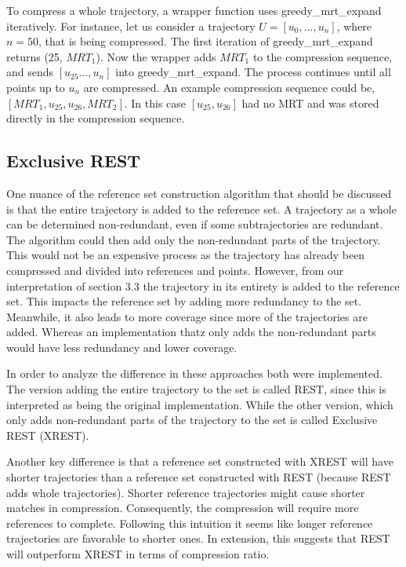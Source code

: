 To compress a whole trajectory, a wrapper function uses greedy\_mrt\_expand iteratively. For instance, let us consider a trajectory $U = [u_0, ..., u_n]$, where $n = 50$, that is being compressed. The first iteration of greedy\_mrt\_expand returns (25, $MRT_1$). Now the wrapper adds $MRT_1$ to the compression sequence, and sends $[u_{25} ..., u_n]$ into greedy\_mrt\_expand. The process continues until all points up to $u_n$ are compressed. An example compression sequence could be, $[MRT_1, u_{25}, u_{26}, MRT_2]$. In this case $[u_{25}, u_{26}]$ had no MRT and was stored directly in the compression sequence.

\subsection{Exclusive REST}
One nuance of the reference set construction algorithm that should be discussed is that the entire trajectory is added to the reference set. A trajectory as a whole can be determined non-redundant, even if some subtrajectories are redundant. The algorithm could then add only the non-redundant parts of the trajectory. This would not be an expensive process as the trajectory has already been compressed and divided into references and points. However, from our interpretation of \textcite{zhao2018rest} section 3.3 the trajectory in its entirety is added to the reference set. This impacts the reference set by adding more redundancy to the set. Meanwhile, it also leads to more coverage since more of the trajectories are added. Whereas an implementation thatz only adds the non-redundant parts would have less redundancy and lower coverage.

In order to analyze the difference in these approaches both were implemented. The version adding the entire trajectory to the set is called REST, since this is interpreted as being the original implementation. While the other version, which only adds non-redundant parts of the trajectory to the set is called Exclusive REST (XREST).

Another key difference is that a reference set constructed with XREST will have shorter trajectories than a reference set constructed with REST (because REST adds whole trajectories). Shorter reference trajectories might cause shorter matches in compression. Consequently, the compression will require more references to complete. Following this intuition it seems like longer reference trajectories are favorable to shorter ones. In extension, this suggests that REST will outperform XREST in terms of compression ratio.

